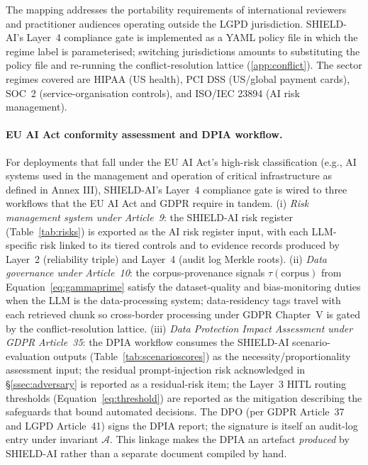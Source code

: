 \documentclass[preprint,12pt,authoryear]{elsarticle}
\begin{document}
The mapping addresses the portability requirements of international reviewers and practitioner audiences operating outside the LGPD jurisdiction. SHIELD-AI's Layer~4 compliance gate is implemented as a YAML policy file in which the regime label is parameterised; switching jurisdictions amounts to substituting the policy file and re-running the conflict-resolution lattice (\ref{app:conflict}). The sector regimes covered are HIPAA (US health), PCI DSS (US/global payment cards), SOC~2 (service-organisation controls), and ISO/IEC 23894 (AI risk management).

\paragraph{EU AI Act conformity assessment and DPIA workflow.}
For deployments that fall under the EU AI Act's high-risk classification (e.g., AI systems used in the management and operation of critical infrastructure as defined in Annex III), SHIELD-AI's Layer~4 compliance gate is wired to three workflows that the EU AI Act and GDPR require in tandem. (i) \emph{Risk management system under Article~9}: the SHIELD-AI risk register (Table~\ref{tab:risks}) is exported as the AI risk register input, with each LLM-specific risk linked to its tiered controls and to evidence records produced by Layer~2 (reliability triple) and Layer~4 (audit log Merkle roots). (ii) \emph{Data governance under Article~10}: the corpus-provenance signals $\tau(\text{corpus})$ from Equation~\ref{eq:gammaprime} satisfy the dataset-quality and bias-monitoring duties when the LLM is the data-processing system; data-residency tags travel with each retrieved chunk so cross-border processing under GDPR Chapter~V is gated by the conflict-resolution lattice. (iii) \emph{Data Protection Impact Assessment under GDPR Article~35}: the DPIA workflow consumes the SHIELD-AI scenario-evaluation outputs (Table~\ref{tab:scenarioscores}) as the necessity/proportionality assessment input; the residual prompt-injection risk acknowledged in §\ref{ssec:adversary} is reported as a residual-risk item; the Layer~3 HITL routing thresholds (Equation~\ref{eq:threshold}) are reported as the mitigation describing the safeguards that bound automated decisions. The DPO (per GDPR Article~37 and LGPD Article~41) signs the DPIA report; the signature is itself an audit-log entry under invariant $\mathcal{A}$. This linkage makes the DPIA an artefact \emph{produced} by SHIELD-AI rather than a separate document compiled by hand.
\end{document}
